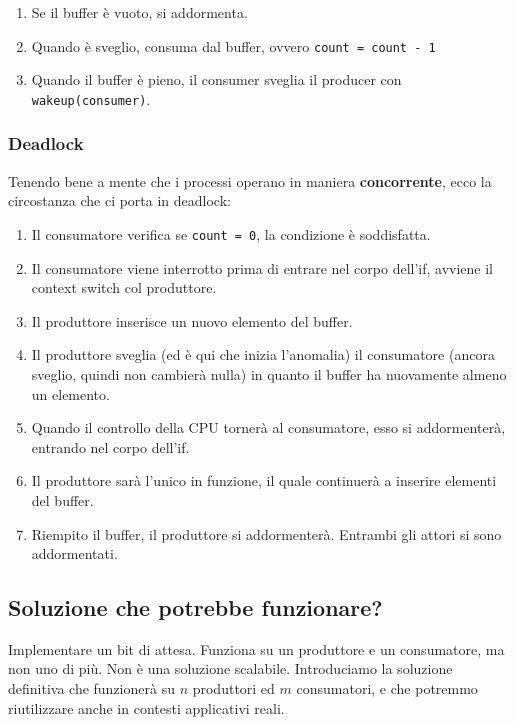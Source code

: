 \documentclass{report}
\begin{document}
\begin{enumerate}
    \item Se il buffer è vuoto, si addormenta.
    \item Quando è sveglio, consuma dal buffer, ovvero \verb|count = count - 1|
    \item Quando il buffer è pieno, il consumer sveglia il producer con \\\verb|wakeup(consumer)|.
\end{enumerate}

\subsubsection{Deadlock}
Tenendo bene a mente che i processi operano in maniera \textbf{concorrente}, ecco la circostanza che ci porta in deadlock:
\begin{enumerate}
    \item Il consumatore verifica se \verb|count = 0|, la condizione è soddisfatta.
    
    \item Il consumatore viene interrotto prima di entrare nel corpo dell'if, avviene il context switch col produttore.
    
    \item Il produttore inserisce un nuovo elemento del buffer.
    
    \item Il produttore sveglia (ed è qui che inizia l'anomalia) il consumatore (ancora sveglio, quindi non cambierà nulla) in quanto il buffer ha nuovamente almeno un elemento.

    \item Quando il controllo della CPU tornerà al consumatore, esso si addormenterà, entrando nel corpo dell'if.

    \item Il produttore sarà l'unico in funzione, il quale continuerà a inserire elementi del buffer.

    \item Riempito il buffer, il produttore si addormenterà. Entrambi gli attori si sono addormentati.
\end{enumerate}

\subsection{Soluzione che potrebbe funzionare?}
Implementare un bit di attesa. Funziona su un produttore e un consumatore, ma non uno di più. Non è una soluzione scalabile. Introduciamo la soluzione definitiva che funzionerà su $n$ produttori ed $m$ consumatori, e che potremmo riutilizzare anche in contesti applicativi reali.
\end{document}
